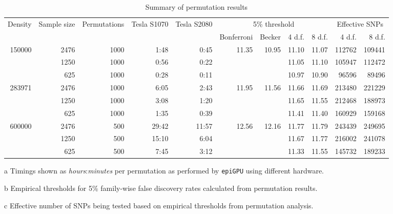 \begin{sidewaystable}
  \begin{center}
  \begin{threeparttable}
  \caption{\label{tab:perm_results}Summary of permutation results}
    \begin{tabular}{rrrrrrrrrrr}
    \toprule
Density & Sample size & Permutations & Tesla S1070 \tnote{a} & Tesla S2080 \tnote{a} & \multicolumn{4}{c}{5\% threshold} & \multicolumn{2}{c}{Effective SNPs \tnote{c}}  \\
& & & & & Bonferroni & Becker & 4 d.f. \tnote{b} & 8 d.f. \tnote{b} & 4 d.f. & 8 d.f. \\
\midrule
\multirow{3}{*}{150000} & 2476 & 1000 & 1:48 & 0:45 & \multirow{3}{*}{11.35} & \multirow{3}{*}{10.95} & 11.10 & 11.07 & 112762 & 109441 \\
& 1250 & 1000 & 0:56 & 0:22 & & & 11.05 & 11.10 & 105947 & 112472 \\
& 625 & 1000 & 0:28 & 0:11 & & & 10.97 & 10.90 & 96596 & 89496 \\
\midrule
 \multirow{3}{*}{283971} & 2476 & 1000 & 6:05 & 2:43 &  \multirow{3}{*}{11.95} &  \multirow{3}{*}{11.56} & 11.66 & 11.69 & 213480 & 221229 \\
& 1250 & 1000 & 3:08 & 1:20 & & & 11.65 & 11.55 & 212468 & 188973 \\
& 625 & 1000 & 1:35 & 0:39 & & & 11.41 & 11.40 & 160929 & 159168 \\
\midrule
 \multirow{3}{*}{600000} & 2476 & 500 & 29:42 & 11:57 & \multirow{3}{*}{12.56} & \multirow{3}{*}{12.16} & 11.77 & 11.79 & 243439 & 249695 \\
& 1250 & 500 & 15:10 & 6:04 & & & 11.67 & 11.77 & 216002 & 241078 \\
& 625 & 500 & 7:45 & 3:12 & & & 11.33 & 11.55 & 145732 & 189233 \\
\bottomrule
\end{tabular}
\begin{tablenotes}{\footnotesize
\item[a] Timings shown as \emph{hours}:\emph{minutes} per permutation as performed by {\tt epiGPU} using different hardware.
\item[b] Empirical thresholds for 5\% family-wise false discovery rates calculated from permutation results.
\item[c] Effective number of SNPs being tested based on empirical thresholds from permutation analysis.
}\end{tablenotes}
\end{threeparttable}
\end{center}
\end{sidewaystable}


